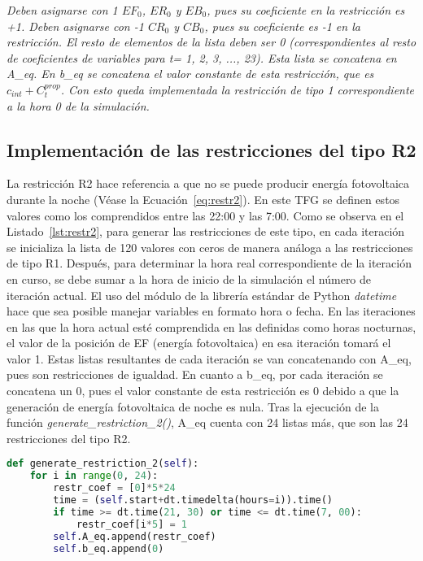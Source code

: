 \textit{Deben asignarse con 1 $ EF_{0} $, $ ER_{0} $ y $ EB_{0} $, pues su coeficiente en la restricción es +1. Deben asignarse con -1 $ CR_{0} $ y $ CB_{0} $, pues su coeficiente es -1 en la restricción. El resto de elementos de la lista deben ser 0 (correspondientes al resto de coeficientes de variables para t= 1, 2, 3, ..., 23). Esta lista se concatena en A\_eq. En b\_eq se concatena el valor constante de esta restricción, que es $ c_{int} + C_{t}^{prop} $. Con esto queda implementada la restricción de tipo 1 correspondiente a la hora 0 de la simulación.}

\subsection{Implementación de las restricciones del tipo R2}
La restricción R2 hace referencia a que no se puede producir energía fotovoltaica durante la noche (Véase la Ecuación~\ref{eq:restr2}). En este \gls{TFG} se definen estos valores como los comprendidos entre las 22:00 y las 7:00. Como se observa en el Listado~\ref{lst:restr2}, para generar las restricciones de este tipo, en cada iteración se inicializa la lista de 120 valores con ceros de manera análoga a las restricciones de tipo R1. Después, para determinar la hora real correspondiente de la iteración en curso, se debe sumar a la hora de inicio de la simulación el número de iteración actual. El uso del módulo de la librería estándar de Python \textit{datetime}~\cite{Dtpy} hace que sea posible manejar variables en formato hora o fecha. En las iteraciones en las que la hora actual esté comprendida en las definidas como horas nocturnas, el valor de la posición de EF (energía fotovoltaica) en esa iteración tomará el valor 1. Estas listas resultantes de cada iteración se van concatenando con A\_eq, pues son restricciones de igualdad. En cuanto a b\_eq, por cada iteración se concatena un 0, pues el valor constante de esta restricción es 0 debido a que la generación de energía fotovoltaica de noche es nula. Tras la ejecución de la función \textit{generate\_restriction\_2()}, A\_eq cuenta con 24 listas más, que son las 24 restricciones del tipo R2.
\begin{lstlisting}[language=Python,float=ht,caption={Restricciones del tipo R2},label={lst:restr2}]
def generate_restriction_2(self):
    for i in range(0, 24):
        restr_coef = [0]*5*24
        time = (self.start+dt.timedelta(hours=i)).time()
        if time >= dt.time(21, 30) or time <= dt.time(7, 00):
            restr_coef[i*5] = 1
        self.A_eq.append(restr_coef)
        self.b_eq.append(0)
\end{lstlisting}
